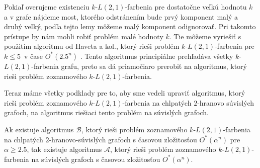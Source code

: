 Pokiaľ overujeme existenciu $k$-$L(2,1)$-farbenia pre dostatočne veľkú hodnotu $k$ a v grafe
nájdeme most, ktorého odstránením bude prvý komponent malý a druhý veľký, podľa tejto lemy
môžeme malý komponent odignorovať. Pri takomto prístupe by nám mohli robiť problém malé
hodnoty $k$. Tie môžeme vyriešiť s použitím algoritmu od Haveta a kol., ktorý rieši
problém $k$-$L(2,1)$-farbenia pre $k \leq 5$ v čase $O^*(2.5^n)$ \cite{havet}. Tento
algoritmus principiálne prehľadáva všetky $k$-$L(2,1)$-farbenia grafu, preto sa dá
priamočiaro prerobiť na algoritmus, ktorý rieši problém zoznamového $k$-$L(2,1)$-farbenia.

Teraz máme všetky podklady pre to, aby sme vedeli upraviť algoritmus,
ktorý rieši problém zoznamového $k$-$L(2,1)$-farbenia na chlpatých
$2$-hranovo súvislých grafoch, na algoritmus riešiaci tento problém
na súvislých grafoch.

\begin{veta}
    Ak existuje algoritmus $\mathcal{B}$, ktorý rieši problém zoznamového $k$-$L(2,1)$-farbenia
    na chlpatých $2$-hranovo-súvislých grafoch s časovou zložitosťou $O^*(\alpha^n)$ pre
    $\alpha \ge 2.5$, tak existuje algoritmus $\mathcal{A}$, ktorý rieši problém zoznamového $k$-$L(2,1)$-farbenia
    na súvislých grafoch s časovou zložitosťou $O^*(\alpha^n)$.
\end{veta}

